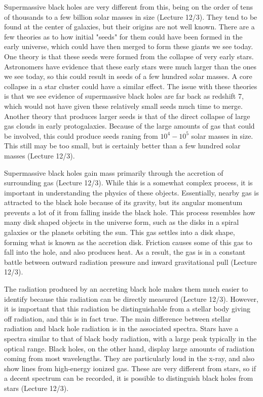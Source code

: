 \documentclass[12pt]{article}
\begin{document}
Supermassive black holes are very different from this, being on the
order of tens of thousands to a few billion solar masses in size (Lecture 12/3).
They tend to
be found at the center of galaxies, but their origins are not well known.  There
are a few theories as to how initial "seeds" for them could have been formed in
the early universe, which could have then merged to form these giants we see
today.  One theory is that these seeds were formed from the collapse of very
early stars.  Astronomers have evidence that these early stars were much larger
than the ones we see today, so this could result in seeds of a few hundred solar
masses.  A core collapse in a star cluster could have a similar effect.  The
issue with these theories is that we see evidence of supermassive black holes
are far back as redshift 7, which would not have given these relatively small
seeds much time to merge.  Another theory that produces larger seeds is that of
the direct collapse of large gas clouds in early protogalaxies.  Because of the
large amounts of gas that could be involved, this could produce seeds raning
from $10^4-10^5$ solar masses in size.  This still may be too small, but is
certainly better than a few hundred solar masses (Lecture 12/3).

Supermassive black holes gain mass primarily through the accretion of
surrounding gas (Lecture 12/3).  While this is a somewhat complex process,
it is important in
understanding the physics of these objects.  Essentially, nearby gas is
attracted to the black hole because of its gravity, but its angular momentum
prevents a lot of it from falling inside the black hole.  This process resembles
how many disk shaped objects in the universe form, such as the disks in a spiral
galaxies or the planets orbiting the sun.  This gas settles into a disk shape,
forming what is known as the accretion disk.  Friction causes some of this gas
to fall into the hole, and also produces heat.  As a result, the gas is in a
constant battle between outward radiation pressure and inward gravitational
pull (Lecture 12/3).

The radiation produced by an accreting black hole makes them much easier to
identify because this radiation can be directly measured (Lecture 12/3).
However, it is
important that this radiation be distinguishable from a stellar body giving off
radiation, and this is in fact true.  The main difference between stellar
radiation and black hole radiation is in the associated spectra.  Stars have a
spectra similar to that of black body radiation, with a large peak typically in
the optical range.  Black holes, on the other hand, display large amounts of
radiation coming from most wavelengths.  They are particularly loud in the
x-ray, and also show lines from high-energy ionized gas.  These are very
different from stars, so if a decent spectrum can be recorded, it is possible to
distinguish black holes from stars (Lecture 12/3).
\end{document}
